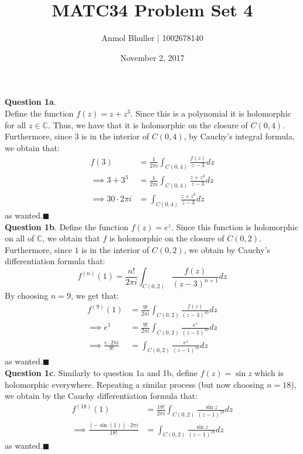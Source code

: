 \documentclass{article}
\title{MATC34 Problem Set 4}
\date{November 2, 2017}
\author{Anmol Bhuller | 1002678140}
\begin{document}
    \maketitle 

    \textbf{Question 1a}.\\
    Define the function $f(z) = z + z^3$. Since this is a polynomial it is holomorphic for all $z\in\mathbb{C}$. Thus, we have that it is holomorphic
    on the closure of $C(0,4)$. Furthermore, since $3$ is in the interior of $C(0,4)$, by Cauchy's integral formula, we obtain that:
    \begin{align*}
        f(3) &= \frac{1}{2\pi i}\int_{C(0,4)}\frac{f(z)}{z-3}dz \\
        \implies 3 + 3^3 &= \frac{1}{2\pi i}\int_{C(0,4)}\frac{z+z^3}{z-3}dz \\
        \implies 30\cdot 2\pi i &= \int_{C(0,4)}\frac{z+z^3}{z-3}dz
    \end{align*}
    as wanted.\hfill$\blacksquare$\\

    \textbf{Question 1b}.
    Define the function $f(z) = e^z$. Since this function is holomorphic on all of $\mathbb{C}$, we obtain that $f$ is holomorphic on the closure
    of $C(0,2)$. Furthermore, since $1$ is in the interior of $C(0,2)$, we obtain by Cauchy's differentiation formula that:
    \[    f^{(n)}(1) = \frac{n!}{2\pi i}\int_{C(0,2)}\frac{f(z)}{(z-3)^{n+1}}dz \]
    By choosing $n = 9$, we get that:
    \begin{align*}
        f^{(9)}(1) &= \frac{9!}{2\pi i}\int_{C(0,2)}\frac{f(z)}{(z-3)^{10}}dz \\
        \implies e^1 &= \frac{9!}{2\pi i}\int_{C(0,2)}\frac{e^z}{(z-1)^{10}}dz \\
        \implies \frac{e\cdot 2\pi i}{9!} &= \int_{C(0,2)}\frac{e^z}{(z-1)^{10}}dz
    \end{align*}
    as wanted.\hfill$\blacksquare$\\

    \textbf{Question 1c}.
    Similarly to question 1a and 1b, define $f(z) = \sin{z}$ which is holomorphic everywhere. 
    Repeating a similar process (but now choosing $n=18$), we obtain by the Cauchy differentiation
    formula that:
    \begin{align*}
        f^{(18)}(1) &= \frac{18!}{2\pi i}\int_{C(0,2)}\frac{\sin{z}}{(z-1)^{19}}dz \\
        \implies \frac{(-\sin(1))\cdot 2\pi i}{18!} &= \int_{C(0,2)}\frac{\sin{z}}{(z-1)^{19}}dz
    \end{align*}
    as wanted.\hfill$\blacksquare$\\
\end{document}
